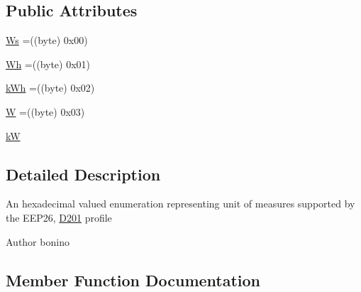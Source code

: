 \subsection*{Public Attributes}
\begin{DoxyCompactItemize}
\item 
\hyperlink{enumit_1_1polito_1_1elite_1_1enocean_1_1enj_1_1eep_1_1eep26_1_1_d2_1_1_d201_1_1_d201_unit_of_measure_aa2b2299b3662e3aba3138ab55d2b90d4}{Ws} =((byte) 0x00)
\item 
\hyperlink{enumit_1_1polito_1_1elite_1_1enocean_1_1enj_1_1eep_1_1eep26_1_1_d2_1_1_d201_1_1_d201_unit_of_measure_a1de3c9981b9efc16a99dd4d6022e6e30}{Wh} =((byte) 0x01)
\item 
\hyperlink{enumit_1_1polito_1_1elite_1_1enocean_1_1enj_1_1eep_1_1eep26_1_1_d2_1_1_d201_1_1_d201_unit_of_measure_a78d19d9f3e9b0b4d66243790f64bc568}{k\+Wh} =((byte) 0x02)
\item 
\hyperlink{enumit_1_1polito_1_1elite_1_1enocean_1_1enj_1_1eep_1_1eep26_1_1_d2_1_1_d201_1_1_d201_unit_of_measure_afc5c3d66ae15831bc26dd30849d8297e}{W} =((byte) 0x03)
\item 
\hyperlink{enumit_1_1polito_1_1elite_1_1enocean_1_1enj_1_1eep_1_1eep26_1_1_d2_1_1_d201_1_1_d201_unit_of_measure_a458959e1ef52b524fa7193c0bb7e773e}{kW}
\end{DoxyCompactItemize}


\subsection{Detailed Description}
An hexadecimal valued enumeration representing unit of measures supported by the E\+E\+P26, \hyperlink{classit_1_1polito_1_1elite_1_1enocean_1_1enj_1_1eep_1_1eep26_1_1_d2_1_1_d201_1_1_d201}{D201} profile \begin{DoxyAuthor}{Author}
bonino 
\end{DoxyAuthor}


\subsection{Member Function Documentation}
\hypertarget{enumit_1_1polito_1_1elite_1_1enocean_1_1enj_1_1eep_1_1eep26_1_1_d2_1_1_d201_1_1_d201_unit_of_measure_aff5365c4950a17c86234aca44f445236}{}\label{enumit_1_1polito_1_1elite_1_1enocean_1_1enj_1_1eep_1_1eep26_1_1_d2_1_1_d201_1_1_d201_unit_of_measure_aff5365c4950a17c86234aca44f445236} 
